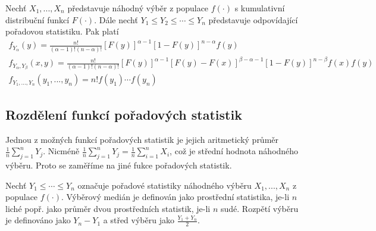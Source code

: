 \begin{theorem}
Nechť $X_1, ..., X_n$ představuje náhodný výběr z populace $f(\cdot)$ s kumulativní distribuční funkcí $F(\cdot)$. Dále nechť $Y_1 \le Y_2 \le \cdots \le Y_n$ představuje odpovídající pořadovou statistiku. Pak platí
\begin{gather*}
f_{Y_{\alpha}}(y) = \frac{n!}{(\alpha - 1)!(n - \alpha)!}[F(y)]^{\alpha - 1}[1 - F(y)]^{n - \alpha}f(y)\\
f_{Y_{\alpha}, Y_{\beta}}(x,y) = \frac{n!}{(\alpha - 1)!(n - \alpha)!}[F(y)]^{\alpha - 1}[F(y) - F(x)]^{\beta - \alpha - 1}[1 - F(y)]^{n - \beta}f(x)f(y)\\
f_{Y_1, ..., Y_n}(y_1, ..., y_n) = n!f(y_1) \cdots f(y_n)
\end{gather*}
\end{theorem}

\subsection{Rozdělení funkcí pořadových statistik}

Jednou z možných funkcí pořadových statistik je jejich aritmetický průměr $\frac{1}{n} \sum_{j = 1}^n Y_j$. Nicméně $\frac{1}{n} \sum_{j = 1}^n Y_j = \frac{1}{n} \sum_{i = 1}^n X_i$, což je střední hodnota náhodného výběru. Proto se zaměříme na jiné fukce pořadových statistik.

\begin{definition}
Nechť $Y_1 \le \cdots \le Y_n$ označuje pořadové statistiky náhodného výběru $X_1, ..., X_n$ z populace $f(\cdot)$. Výběrový medián je definován jako prostřední statistika, je-li $n$ liché popř. jako průměr dvou prostředních statistik, je-li $n$ sudé. Rozpětí výběru je definováno jako $Y_n - Y_1$ a střed výběru jako $\frac{Y_1 + Y_n}{2}$.
\end{definition}

